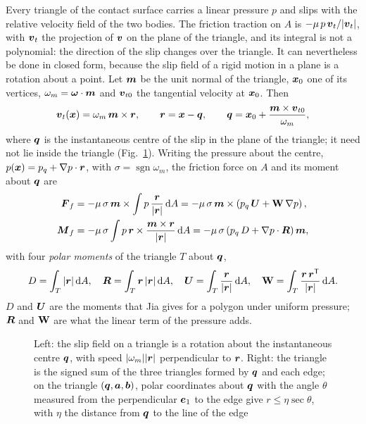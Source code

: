 Every triangle of the contact surface carries a linear pressure $p$ and slips with the relative
velocity field of the two bodies. The friction traction on $A$ is $-\mu\,p\,\boldsymbol{v}_t/|\boldsymbol{v}_t|$, with
$\boldsymbol{v}_t$ the projection of $\boldsymbol{v}$ on the plane of the triangle, and its integral is not a
polynomial: the direction of the slip changes over the triangle. It can nevertheless be done in
closed form, because the slip field of a rigid motion in a plane is a rotation about a point.
Let $\boldsymbol{m}$ be the unit normal of the triangle, $\boldsymbol{x}_0$ one of its vertices, $\omega_m = \boldsymbol{\omega}\cdot\boldsymbol{m}$
and $\boldsymbol{v}_{t0}$ the tangential velocity at $\boldsymbol{x}_0$. Then
\begin{equation}
  \boldsymbol{v}_t(\boldsymbol{x}) = \omega_m\,\boldsymbol{m}\times\boldsymbol{r} ,
  \qquad \boldsymbol{r} = \boldsymbol{x} - \boldsymbol{q}, \qquad \boldsymbol{q} = \boldsymbol{x}_0 + \frac{\boldsymbol{m}\times\boldsymbol{v}_{t0}}{\omega_m} ,
  \label{eq:centre}
\end{equation}
where $\boldsymbol{q}$ is the instantaneous centre of the slip in the plane of the triangle; it need not
lie inside the triangle (Fig.~\ref{fig:slip}). Writing the pressure about the centre,
$p(\boldsymbol{x}) = p_q + \nabla p\cdot\boldsymbol{r}$, with $\sigma = \operatorname{sgn}\omega_m$, the friction force
on $A$ and its moment about $\boldsymbol{q}$ are
\begin{align}
  \boldsymbol{F}_f &= -\mu\,\sigma\,\boldsymbol{m}\times\int p\,\frac{\boldsymbol{r}}{|\boldsymbol{r}|}\,\mathrm{d} A
     = -\mu\,\sigma\,\boldsymbol{m}\times\left(p_q\,\boldsymbol{U} + \mathbf{W}\,\nabla p\right), \label{eq:friction-force}\\
  \boldsymbol{M}_f &= -\mu\,\sigma\int p\,\boldsymbol{r}\times\frac{\boldsymbol{m}\times\boldsymbol{r}}{|\boldsymbol{r}|}\,\mathrm{d} A
     = -\mu\,\sigma\left(p_q\,D + \nabla p\cdot\boldsymbol{R}\right)\boldsymbol{m} , \label{eq:friction-moment}
\end{align}
with four \emph{polar moments} of the triangle $T$ about $\boldsymbol{q}$,
\begin{equation}
  D = \int_T |\boldsymbol{r}|\,\mathrm{d} A, \quad
  \boldsymbol{R} = \int_T \boldsymbol{r}\,|\boldsymbol{r}|\,\mathrm{d} A, \quad
  \boldsymbol{U} = \int_T \frac{\boldsymbol{r}}{|\boldsymbol{r}|}\,\mathrm{d} A, \quad
  \mathbf{W} = \int_T \frac{\boldsymbol{r}\,\boldsymbol{r}^{\mathsf T}}{|\boldsymbol{r}|}\,\mathrm{d} A .
  \label{eq:moments}
\end{equation}
$D$ and $\boldsymbol{U}$ are the moments that Jia \cite{Jia1997} gives for a polygon under uniform
pressure; $\boldsymbol{R}$ and $\mathbf{W}$ are what the linear term of the pressure adds.

\begin{figure}[t]
\centering

\caption{Left: the slip field on a triangle is a rotation about the instantaneous centre $\boldsymbol{q}$,
with speed $|\omega_m||\boldsymbol{r}|$ perpendicular to $\boldsymbol{r}$. Right: the triangle is the signed sum of
the three triangles formed by $\boldsymbol{q}$ and each edge; on the triangle $(\boldsymbol{q}, \boldsymbol{a}, \boldsymbol{b})$,
polar coordinates about $\boldsymbol{q}$ with the angle $\theta$ measured from the perpendicular $\boldsymbol{e}_1$
to the edge give $r \le \eta\sec\theta$, with $\eta$ the distance from $\boldsymbol{q}$ to the line of the edge}
\label{fig:slip}
\end{figure}

